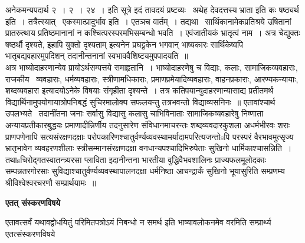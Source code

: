 \documentclass[11pt, openany]{book}
\begin{document}
अनेकमन्यपदार्थ २~। २~। २४~। इति सूत्रे {\qt इदं तावदयं प्रष्टव्यः \textendash\ अथेह देवदत्तस्य भ्राता इति कः षष्ठ्यर्थ इति~। तत्रैत्स्यात् \textendash\ एकस्मात्प्रादुर्भाव इति~। एतञच वार्तम्~। तद्यथा \textendash\ सार्थिकानामेकप्रतिश्रये उषितानां प्रातरुत्थाय प्रतिष्ठमानानां न कश्चित्परस्परमभिसम्बन्धो भवति~। एवंजातीयकं भ्रातृत्वं नाम~। अत्र चेद्युक्तः षष्ठर्थौ दृश्यते, इहापि युक्तो दृश्यताम्} इत्यनेन प्रघट्टकेन भगवान् भाष्यकारः सार्थिकेष्वपि भातृबद्यवहारमुपदिशन् तदानीन्तनानां स्वभाववैशिष्ट्यमुपपादयति~॥\\

अत्र भाष्योदाहरणान्येव प्रायोऽर्थसम्पत्तये समाहृतानि~। भाष्योदाहरणेषु च विद्याः, कलाः, सामाजिकव्यवहाराः, राजकीय \textendash\ व्यवहाराः, धर्मव्यवहाराः, स्त्रीणामधिकाराः, प्रमाणप्रमेयादिव्यवहाराः, वाहनप्रकाराः, आरण्यकन्यायाः, शब्दव्यवहारा इत्यादयोऽनेके विषयाः संगृहीता दृश्यन्ते~। तत्र कतिपयान्युदाहरणान्यासाद्य प्रतीतमर्थ विद्यार्थिनामुपयोगायात्रोपनिबद्धं सुचिरमालोक्य सफलयन्तु तत्रभवन्तो विद्याव्यसनिनः~॥ एतावांश्चार्थ उपलभ्यते \textendash\ तदानींतना जनाः सर्वासु विद्यासु कलासु चाभिविनाताः सामाजिकव्यवहारेषु निष्णाता अन्यायप्रतीकारबुद्धयः प्रमाणादीन्निर्णीय तदनुसारेण संविधानमाचरन्तः शब्दव्यवदारकुशला अधर्मभीरवः शराः प्राणपणेनापि सत्यसंरक्षणदक्षाः परोपकारिणश्चातुर्वर्ण्यव्यवस्थामर्यादामपरित्यजन्तोsपि परस्परं वैरभावमुत्सृज्य भ्रातृभावेन व्यवहरणशीलाः स्त्रीसम्मानसंरक्षणदक्षा वनधान्यपश्चादिभिरुपेताः सुखिनो धार्मिकाश्चासन्निति~। तथाsचिरोद्गतस्वातन्त्र्यरसा प्लाविता इदानीन्तना भारतीया वुद्धिवैभवशालिनः प्राज्यफलमूलोदकाः सम्पन्नतरगोरसाः सुविद्याश्चातुर्वर्ण्यव्यवस्थापालनदक्षा धर्मनिष्ठा आचन्द्रार्कं सुखिनो भूयासुरिति सम्प्रणम्य श्रीविश्वेश्वरचरणौ सम्प्रार्थयामः~॥

\begin{center}
\textbf{\Large एतत् संस्करणविषये \textendash\ }
\end{center}

एतावत्सर्वं यथावद्वोधयितुं परिमितपत्रोऽयं निबन्धो न समर्थ इति भाष्यावलोकनमेव वरमिति सम्प्रार्थ्य एतत्संस्करणविषये

\newpage
\end{document}
